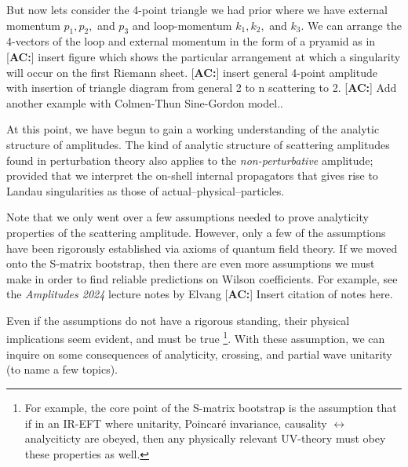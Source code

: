 \documentclass[a4paper,11pt]{article}
\newcommand{\ac}[1]{\textcolor{green3}{[\textbf{AC:}] #1}}
\begin{document}
But now lets consider the 4-point triangle we had prior where we have external momentum $p_1,p_2,$ and $p_3$ and loop-momentum $k_1,k_2,$ and $k_3$. We can arrange the 4-vectors of the loop and external momentum in the form of a pryamid as in \ac{insert figure} which shows the particular arrangement at which a singularity will occur on the first Riemann sheet. \ac{insert general 4-point amplitude with insertion of triangle diagram from general 2 to n scattering to 2.} \ac{Add another example with Colmen-Thun Sine-Gordon model.}\cite{Coleman:1978kk}. 

At this point, we have begun to gain a working understanding of the analytic structure of amplitudes. The kind of analytic structure of scattering amplitudes found in perturbation theory also applies to the \textit{non-perturbative} amplitude; provided that we interpret the on-shell internal propagators that gives rise to Landau singularities as those of actual--physical--particles.

Note that we only went over a few assumptions needed to prove analyticity properties of the scattering amplitude. However, only a few of the assumptions have been rigorously established via axioms of quantum field theory. If we moved onto the S-matrix bootstrap, then there are even more assumptions we must make in order to find reliable predictions on Wilson coefficients. For example, see the \textit{Amplitudes 2024} lecture notes by Elvang \ac{Insert citation of notes here}. 

Even if the assumptions do not have a rigorous standing, their physical implications seem evident, and must be true \footnote{For example, the core point of the S-matrix bootstrap is the assumption that if in an IR-EFT where unitarity, Poincar\'e invariance, causality $\leftrightarrow$ analyciticty are obeyed, then any physically relevant UV-theory must obey these properties as well.}. With these assumption, we can inquire on some consequences of analyticity, crossing, and partial wave unitarity (to name a few topics). 
\end{document}
